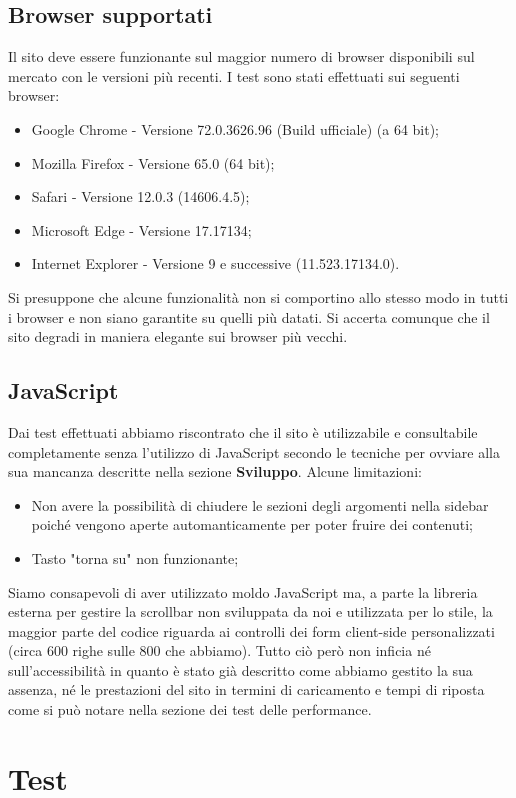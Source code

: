 \documentclass[12pt]{article}
\begin{document}
	\subsection{Browser supportati}
	Il sito deve essere funzionante sul maggior numero di browser disponibili sul mercato con le versioni più recenti. I test sono stati effettuati sui seguenti browser:
		\begin{itemize}
			\item Google Chrome - Versione 72.0.3626.96 (Build ufficiale) (a 64 bit);
			\item Mozilla Firefox - Versione 65.0 (64 bit);
			\item Safari - Versione 12.0.3 (14606.4.5);
			\item Microsoft Edge - Versione 17.17134;
			\item Internet Explorer - Versione 9 e successive (11.523.17134.0).
		\end{itemize}
	Si presuppone che alcune funzionalità non si comportino allo stesso modo in tutti i browser e non siano garantite su quelli più datati. Si accerta comunque che il sito degradi in	maniera elegante sui browser più vecchi.
	\subsection{JavaScript}
	Dai test effettuati abbiamo riscontrato che il sito è utilizzabile e consultabile completamente senza l'utilizzo di JavaScript secondo le tecniche per ovviare alla sua mancanza descritte nella sezione \textbf{Sviluppo}. Alcune limitazioni:
	\begin{itemize}
		\item Non avere la possibilità di chiudere le sezioni degli argomenti nella sidebar poiché vengono aperte automanticamente per poter fruire dei contenuti;
		\item Tasto "torna su" non funzionante;
	\end{itemize}
	Siamo consapevoli di aver utilizzato moldo JavaScript ma, a parte la libreria esterna per gestire la scrollbar non sviluppata da noi e utilizzata per lo stile, la maggior parte del codice riguarda ai controlli dei form client-side personalizzati (circa 600 righe sulle 800 che abbiamo).
	Tutto ciò però non inficia né sull'accessibilità in quanto è stato già descritto come abbiamo gestito la sua assenza, né le prestazioni del sito in termini di caricamento e tempi di riposta come si può notare nella sezione dei test delle performance.
	
	\section{Test}
\end{document}
